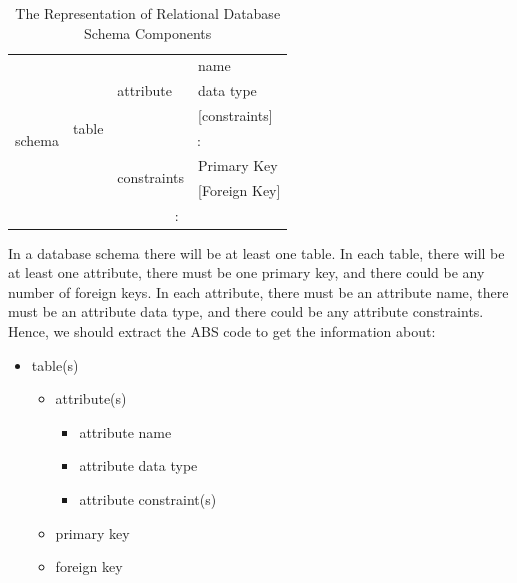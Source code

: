 \documentclass[conference]{IEEEtran}
\begin{document}
\begin{table}[]
	\centering
	\caption{The Representation of Relational Database Schema Components}
	\label{tabel1}
	\begin{tabular}{|l|l|l|l|}
		\hline
		\multirow{9}{*}{schema} & \multirow{7}{*}{table} & \multirow{3}{*}{attribute}   & name              \\ \cline{4-4}
		&                        &                              & data type         \\ \cline{4-4}
		&                        &                              & {[}constraints{]} \\ \cline{3-4}
		&                        & \multicolumn{2}{c|}{\multirow{2}{*}{:}}          \\
		&                        & \multicolumn{2}{c|}{}                            \\ \cline{3-4}
		&                        & \multirow{2}{*}{constraints} & Primary Key       \\ \cline{4-4}
		&                        &                              & {[}Foreign Key{]} \\ \cline{2-4}
		& \multicolumn{3}{c|}{\multirow{2}{*}{:}}                                   \\
		& \multicolumn{3}{c|}{}                                                     \\ \hline
	\end{tabular}
\end{table}

In a database schema there will be at least one table. In each table, there will be at least one attribute, there must be one primary key, and there could be any number of foreign keys. In each attribute, there must be an attribute name, there must be an attribute data type, and there could be any attribute constraints. Hence, we should extract the ABS code to get the information about:
\begin{itemize}
	\item table(s)
	\begin{itemize}
		\item attribute(s)
		\begin{itemize}
			\item attribute name
			\item attribute data type
			\item attribute constraint(s)
		\end{itemize}
		\item primary key
		\item foreign key
	\end{itemize}
\end{itemize}
\end{document}
